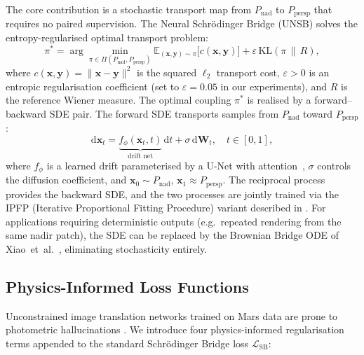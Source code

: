 \documentclass[10pt,journal]{IEEEtran}
\begin{document}
The core contribution is a stochastic transport map from $P_{\mathrm{nad}}$ to
$P_{\mathrm{persp}}$ that requires no paired supervision. The Neural
Schr\"{o}dinger Bridge (UNSB) \cite{kim2024unsb} solves the entropy-regularised
optimal transport problem:
\begin{equation}
  \pi^* = \arg\min_{\pi \in \Pi(P_{\mathrm{nad}}, P_{\mathrm{persp}})}
    \mathbb{E}_{(\mathbf{x},\mathbf{y}) \sim \pi}
    \bigl[c(\mathbf{x}, \mathbf{y})\bigr]
    + \varepsilon \, \mathrm{KL}(\pi \,\|\, R),
  \label{eq:sb_ot}
\end{equation}
where $c(\mathbf{x}, \mathbf{y}) = \|\mathbf{x} - \mathbf{y}\|^2$ is the
squared $\ell_2$ transport cost, $\varepsilon > 0$ is an entropic regularisation
coefficient (set to $\varepsilon = 0.05$ in our experiments), and $R$ is the
reference Wiener measure. The optimal coupling $\pi^*$ is realised by a
forward--backward SDE pair. The forward SDE transports samples from
$P_{\mathrm{nad}}$ toward $P_{\mathrm{persp}}$:
\begin{equation}
  \mathrm{d}\mathbf{x}_t = \underbrace{f_\phi(\mathbf{x}_t, t)}_{\text{drift net}}\,\mathrm{d}t
    + \sigma \,\mathrm{d}\mathbf{W}_t, \quad t \in [0, 1],
  \label{eq:sb_forward}
\end{equation}
where $f_\phi$ is a learned drift parameterised by a U-Net with
attention~\cite{kim2024unsb}, $\sigma$ controls the diffusion coefficient, and
$\mathbf{x}_0 \sim P_{\mathrm{nad}}$, $\mathbf{x}_1 \approx P_{\mathrm{persp}}$.
The reciprocal process provides the backward SDE, and the two processes are
jointly trained via the IPFP (Iterative Proportional Fitting Procedure)
variant described in \cite{kim2024unsb}. For applications requiring
deterministic outputs (e.g.\ repeated rendering from the same nadir patch), the
SDE can be replaced by the Brownian Bridge ODE of
Xiao~et~al.~\cite{xiao2025brownian}, eliminating stochasticity entirely.

\subsection{Physics-Informed Loss Functions}
\label{sec:losses}

Unconstrained image translation networks trained on Mars data are prone to
photometric hallucinations \cite{aithal2024hallucination,rathkopf2025reliability}.
We introduce four physics-informed regularisation terms appended to the standard
Schr\"{o}dinger Bridge loss $\mathcal{L}_{\mathrm{SB}}$:
\end{document}
